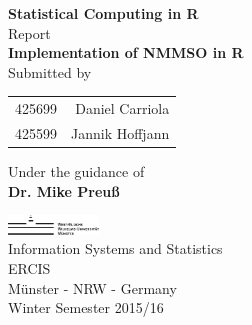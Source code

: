 \begin{titlepage}

\begin{center}

\textup{\small {\bf Statistical Computing in R} \\ Report}\\[0.2in]

\Large \textbf {Implementation of NMMSO in R}\\[0.5in]

\normalsize Submitted by \\
\begin{table}[h]
\centering
\begin{tabular}{lr}
425699 & Daniel Carriola \\ 
425599 & Jannik Hoffjann \\
\end{tabular}
\end{table}

\vspace{.1in}
Under the guidance of\\
{\textbf{Dr. Mike Preuß}}\\[0.2in]

\vfill

\includegraphics[width=0.18\textwidth]{./assets/wwu-logo}\\[0.1in]
\Large{Information Systems and Statistics}\\
\normalsize
\textsc{ERCIS}\\
Münster - NRW - Germany \\
\vspace{0.2cm}
Winter Semester 2015/16

\end{center}

\end{titlepage}